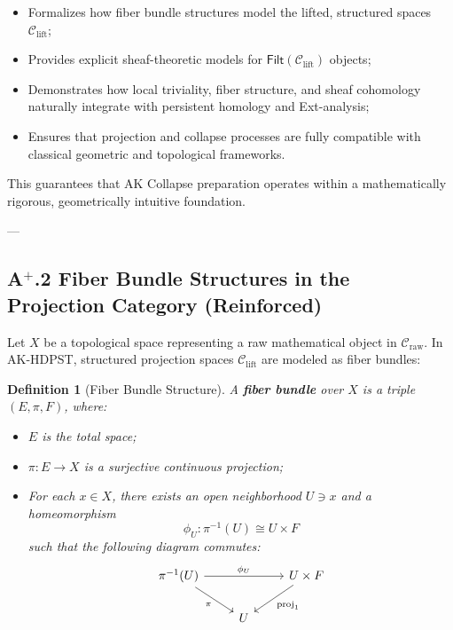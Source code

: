 \documentclass[11pt]{article}
\newtheorem{definition}[theorem]{Definition}
\begin{document}
\begin{itemize}
    \item Formalizes how fiber bundle structures model the lifted, structured spaces $\mathcal{C}_{\mathrm{lift}}$;
    \item Provides explicit sheaf-theoretic models for $\mathsf{Filt}(\mathcal{C}_{\mathrm{lift}})$ objects;
    \item Demonstrates how local triviality, fiber structure, and sheaf cohomology naturally integrate with persistent homology and Ext-analysis;
    \item Ensures that projection and collapse processes are fully compatible with classical geometric and topological frameworks.
\end{itemize}

This guarantees that AK Collapse preparation operates within a mathematically rigorous, geometrically intuitive foundation.

---

\subsection*{A$^{+}$.2 Fiber Bundle Structures in the Projection Category (Reinforced)}

Let \( X \) be a topological space representing a raw mathematical object in \( \mathcal{C}_{\mathrm{raw}} \). In AK-HDPST, structured projection spaces \( \mathcal{C}_{\mathrm{lift}} \) are modeled as fiber bundles:

\begin{definition}[Fiber Bundle Structure]
A \textbf{fiber bundle} over \( X \) is a triple \( (E, \pi, F) \), where:
\begin{itemize}
    \item \( E \) is the total space;
    \item \( \pi : E \rightarrow X \) is a surjective continuous projection;
    \item For each \( x \in X \), there exists an open neighborhood \( U \ni x \) and a homeomorphism
    \[
    \phi_U : \pi^{-1}(U) \cong U \times F
    \]
    such that the following diagram commutes:
    \[
    \begin{tikzcd}
    \pi^{-1}(U) \arrow[rr, "\phi_U"] \arrow[dr, "\pi"']
    & & U \times F \arrow[dl, "\mathrm{proj}_1"] \\
    & U &
    \end{tikzcd}
    \]
\end{itemize}
\end{definition}
\end{document}
